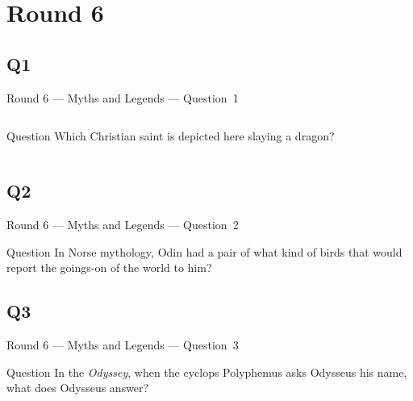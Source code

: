 \documentclass[11pt]{beamer}
\begin{document}
\section{Round 6}
\subsection*{Q1}
\begin{frame}[t]{Round 6 --- Myths and Legends --- \mbox{Question 1}}
\vspace{-0.5em}
\begin{columns}[T,totalwidth=\linewidth]
\begin{column}{0.32\linewidth}
\begin{block}{Question}
Which Christian saint is depicted here slaying a dragon?
\end{block}
\end{column}
\begin{column}{0.65\linewidth}
\begin{center}
\texttt{[image: \{Images/georgedragon]}.jpg}
\end{center}
\end{column}
\end{columns}
\end{frame}
\subsection*{Q2}
\begin{frame}[t]{Round 6 --- Myths and Legends --- \mbox{Question 2}}
\vspace{-0.5em}
\begin{block}{Question}
In Norse mythology, Odin had a pair of what kind of birds that would report the goings-on of the world to him?
\end{block}
\end{frame}
\subsection*{Q3}
\begin{frame}[t]{Round 6 --- Myths and Legends --- \mbox{Question 3}}
\vspace{-0.5em}
\begin{block}{Question}
In the \emph{Odyssey}, when the cyclops Polyphemus asks Odysseus his name, what does Odysseus answer?
\end{block}
\end{frame}
\end{document}
